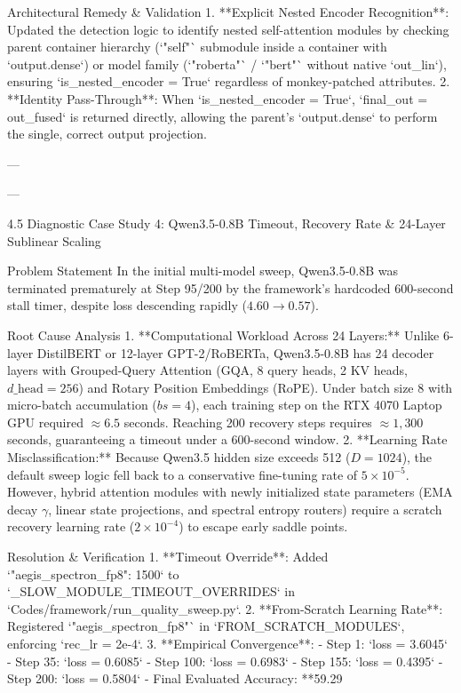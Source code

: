  Architectural Remedy \& Validation
1. **Explicit Nested Encoder Recognition**: Updated the detection logic to identify nested self-attention modules by checking parent container hierarchy (`"self"` submodule inside a container with `output.dense`) or model family (`"roberta"` / `"bert"` without native `out\_lin`), ensuring `is\_nested\_encoder = True` regardless of monkey-patched attributes.
2. **Identity Pass-Through**: When `is\_nested\_encoder = True`, `final\_out = out\_fused` is returned directly, allowing the parent's `output.dense` to perform the single, correct output projection.

---

---

 4.5 Diagnostic Case Study 4: Qwen3.5-0.8B Timeout, Recovery Rate & 24-Layer Sublinear Scaling

 Problem Statement
In the initial multi-model sweep, Qwen3.5-0.8B was terminated prematurely at Step 95/200 by the framework's hardcoded 600-second stall timer, despite loss descending rapidly ($4.60 \to 0.57$).

 Root Cause Analysis
1. **Computational Workload Across 24 Layers:**
   Unlike 6-layer DistilBERT or 12-layer GPT-2/RoBERTa, Qwen3.5-0.8B has 24 decoder layers with Grouped-Query Attention (GQA, 8 query heads, 2 KV heads, $d\_{\text{head}}=256$) and Rotary Position Embeddings (RoPE). Under batch size 8 with micro-batch accumulation ($bs=4$), each training step on the RTX 4070 Laptop GPU required $\approx 6.5$ seconds. Reaching 200 recovery steps requires $\approx 1,300$ seconds, guaranteeing a timeout under a 600-second window.
2. **Learning Rate Misclassification:**
   Because Qwen3.5 hidden size exceeds 512 ($D=1024$), the default sweep logic fell back to a conservative fine-tuning rate of $5 \times 10^{-5}$. However, hybrid attention modules with newly initialized state parameters (EMA decay $\gamma$, linear state projections, and spectral entropy routers) require a scratch recovery learning rate ($2 \times 10^{-4}$) to escape early saddle points.

 Resolution \& Verification
1. **Timeout Override**: Added `"aegis\_spectron\_fp8": 1500` to `\_SLOW\_MODULE\_TIMEOUT\_OVERRIDES` in `Codes/framework/run\_quality\_sweep.py`.
2. **From-Scratch Learning Rate**: Registered `"aegis\_spectron\_fp8"` in `FROM\_SCRATCH\_MODULES`, enforcing `rec\_lr = 2e-4`.
3. **Empirical Convergence**:
   - Step 1: `loss = 3.6045`
   - Step 35: `loss = 0.6085`
   - Step 100: `loss = 0.6983`
   - Step 155: `loss = 0.4395`
   - Step 200: `loss = 0.5804`
   - Final Evaluated Accuracy: **59.29%

